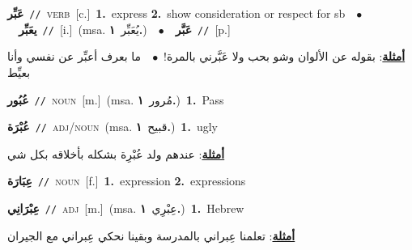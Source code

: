 \documentclass[10pt,a4paper,twoside]{article} %
\begin{document}
\begin{multicols}{2}
{{{\setlength\topsep{0pt}\textbf{\foreignlanguage{arabic}{عَبِّر}}\ {\color{gray}\texttt{//}\color{black}}\ \textsc{verb}\ [c.]\ \textbf{1.}~express  \textbf{2.}~show consideration or respect for sb\ \ $\bullet$\ \ \setlength\topsep{0pt}\textbf{\foreignlanguage{arabic}{يعَبِّر}}\ {\color{gray}\texttt{//}\color{black}}\ [i.]\ \color{gray}(msa. \foreignlanguage{arabic}{يُعَبِّر}~\foreignlanguage{arabic}{\textbf{١.}})\color{black}\ \ $\bullet$\ \ \setlength\topsep{0pt}\textbf{\foreignlanguage{arabic}{عَبَّر}}\ {\color{gray}\texttt{//}\color{black}}\ [p.]\  \begin{flushright}\color{gray}\foreignlanguage{arabic}{\textbf{\underline{\foreignlanguage{arabic}{أمثلة}}}: بقوله عن الألوان وشو بحب ولا عَبَّرني بالمرة!\ $\bullet$\ \  ما بعرف أعبِّر عن نفسي وأنا بعيِّط}\end{flushright}\color{black}} \vspace{2mm}

{\setlength\topsep{0pt}\textbf{\foreignlanguage{arabic}{عُبُور}}\ {\color{gray}\texttt{//}\color{black}}\ \textsc{noun}\ [m.]\ \color{gray}(msa. \foreignlanguage{arabic}{مُرور}~\foreignlanguage{arabic}{\textbf{١.}})\color{black}\ \textbf{1.}~Pass\ 

{\setlength\topsep{0pt}\textbf{\foreignlanguage{arabic}{عُبْرَة}}\ {\color{gray}\texttt{//}\color{black}}\ \textsc{adj/noun}\ \color{gray}(msa. \foreignlanguage{arabic}{قبيح}~\foreignlanguage{arabic}{\textbf{١.}})\color{black}\ \textbf{1.}~ugly\  \begin{flushright}\color{gray}\foreignlanguage{arabic}{\textbf{\underline{\foreignlanguage{arabic}{أمثلة}}}: عندهم ولد عُبْرِة بشكله بأخلاقه بكل شي}\end{flushright}\color{black}} \vspace{2mm}

{\setlength\topsep{0pt}\textbf{\foreignlanguage{arabic}{عِبَارَة}}\ {\color{gray}\texttt{//}\color{black}}\ \textsc{noun}\ [f.]\ \textbf{1.}~expression  \textbf{2.}~expressions\ 

{\setlength\topsep{0pt}\textbf{\foreignlanguage{arabic}{عِبْرَانِي}}\ {\color{gray}\texttt{//}\color{black}}\ \textsc{adj}\ [m.]\ \color{gray}(msa. \foreignlanguage{arabic}{عِبْرِي}~\foreignlanguage{arabic}{\textbf{١.}})\color{black}\ \textbf{1.}~Hebrew\  \begin{flushright}\color{gray}\foreignlanguage{arabic}{\textbf{\underline{\foreignlanguage{arabic}{أمثلة}}}: تعلمنا عِبراني بالمدرسة وبقينا نحكي عِبراني مع الجيران}\end{flushright}\color{black}} \vspace{2mm}

}}}}
\end{multicols}
\end{document}
